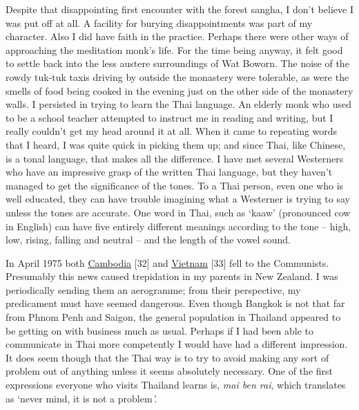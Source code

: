 Despite that disappointing first encounter with the forest sangha, I
don't believe I was put off at all. A facility for burying
disappointments was part of my character. Also I did have faith in the
practice. Perhaps there were other ways of approaching the meditation
monk's life. For the time being anyway, it felt good to settle back into
the less austere surroundings of Wat Boworn. The noise of the rowdy
tuk-tuk taxis driving by outside the monastery were tolerable, as were
the smells of food being cooked in the evening just on the other side of
the monastery walls. I persisted in trying to learn the Thai language.
An elderly monk who used to be a school teacher attempted to instruct me
in reading and writing, but I really couldn't get my head around it at
all. When it came to repeating words that I heard, I was quite quick in
picking them up; and since Thai, like Chinese, is a tonal language, that
makes all the difference. I have met several Westerners who have an
impressive grasp of the written Thai language, but they haven't managed
to get the significance of the tones. To a Thai person, even one who is
well educated, they can have trouble imagining what a Westerner is
trying to say unless the tones are accurate. One word in Thai, such as
`kaaw' (pronounced cow in English) can have five entirely different
meanings according to the tone -- high, low, rising, falling and neutral
-- and the length of the vowel sound.

In April 1975 both
\href{https://en.wikipedia.org/wiki/Fall_of_Phnom_Penh}{\underline{Cambodia}}
{[}32{]} and
\href{https://en.wikipedia.org/wiki/Fall_of_Saigon}{\underline{Vietnam}}
{[}33{]} fell to the Communists. Presumably this news caused trepidation
in my parents in New Zealand. I was periodically sending them an
aerogramme; from their perspective, my predicament must have seemed
dangerous. Even though Bangkok is not that far from Phnom Penh and
Saigon, the general population in Thailand appeared to be getting on
with business much as usual. Perhaps if I had been able to communicate
in Thai more competently I would have had a different impression. It
does seem though that the Thai way is to try to avoid making any sort of
problem out of anything unless it seems absolutely necessary. One of the
first expressions everyone who visits Thailand learns is, \emph{mai ben
rai}, which translates as `never mind, it is not a problem\emph{'.}



